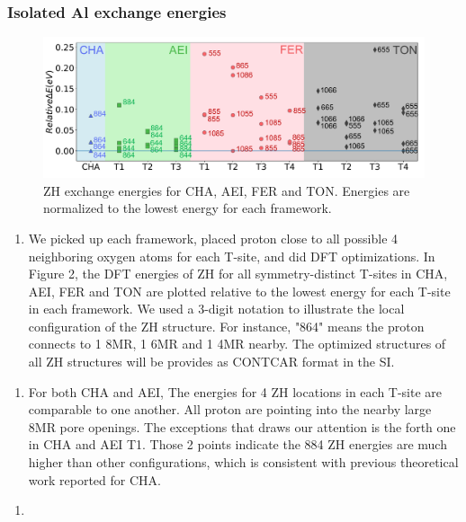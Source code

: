 \documentclass[12pt]{article}
\begin{document}
\subsubsection*{Isolated Al exchange energies}
\begin{figure}[H]
\centering
  \includegraphics[width=5.2in]{./Figures/Figure-2}
  \caption{ZH exchange energies for CHA, AEI, FER and TON. Energies are normalized to the lowest energy for each framework.}
  \label{ZH energies}
\end{figure}

\begin{enumerate}
\item We picked up each framework, placed proton close to all possible 4 neighboring oxygen atoms for each T-site, and did DFT optimizations. In Figure 2, the DFT energies of ZH for all symmetry-distinct T-sites in CHA, AEI, FER and TON are plotted relative to the lowest energy for each T-site in each framework. We used a 3-digit notation to illustrate the local configuration of the ZH structure. For instance, "864" means the proton connects to 1 8MR, 1 6MR and 1 4MR nearby. The optimized structures of all ZH structures will be provides as CONTCAR format in the SI.
\end{enumerate}

\begin{enumerate}[resume]
\item For both CHA and AEI, The energies for 4 ZH locations in each T-site are comparable to one another. All proton are pointing into the nearby large 8MR pore openings. The exceptions that draws our attention is the forth one in CHA and AEI T1. Those 2 points indicate the 884 ZH energies are much higher than other configurations, which is consistent with previous theoretical work reported for CHA.\citep{Li2018JPCC}
\end{enumerate}

\begin{enumerate}[resume]
\item 
\end{enumerate}
\end{document}
